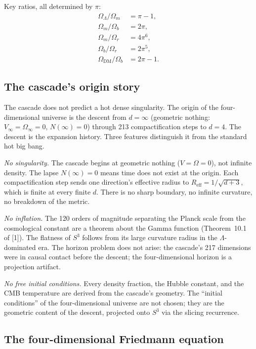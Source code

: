 \documentclass[12pt,a4paper]{article}
\theoremstyle{remark}
\begin{document}
\medskip

\noindent Key ratios, all determined by $\pi$:
\begin{align*}
\Omega_\Lambda / \Omega_m &= \pi - 1, \\
\Omega_m / \Omega_b &= 2\pi, \\
\Omega_m / \Omega_r &= 4\pi^6, \\
\Omega_b / \Omega_r &= 2\pi^5, \\
\Omega_{\mathrm{DM}} / \Omega_b &= 2\pi - 1.
\end{align*}

\subsection{The cascade's origin story}

The cascade does not predict a hot dense singularity. The origin of the four-dimensional universe is the descent from $d = \infty$ (geometric nothing: $V_\infty = \Omega_\infty = 0$, $N(\infty) = 0$) through 213 compactification steps to $d = 4$. The descent is the expansion history. Three features distinguish it from the standard hot big bang.

\emph{No singularity.} The cascade begins at geometric nothing ($V = \Omega = 0$), not infinite density. The lapse $N(\infty) = 0$ means time does not exist at the origin. Each compactification step sends one direction's effective radius to $R_{\mathrm{eff}} = 1/\sqrt{d+3}$, which is finite at every finite $d$. There is no sharp boundary, no infinite curvature, no breakdown of the metric.

\emph{No inflation.} The 120 orders of magnitude separating the Planck scale from the cosmological constant are a theorem about the Gamma function (Theorem~10.1 of [1]). The flatness of $S^3$ follows from its large curvature radius in the $\Lambda$-dominated era. The horizon problem does not arise: the cascade's 217 dimensions were in causal contact before the descent; the four-dimensional horizon is a projection artifact.

\emph{No free initial conditions.} Every density fraction, the Hubble constant, and the CMB temperature are derived from the cascade's geometry. The ``initial conditions'' of the four-dimensional universe are not chosen; they are the geometric content of the descent, projected onto $S^3$ via the slicing recurrence.

\subsection{The four-dimensional Friedmann equation}
\end{document}
